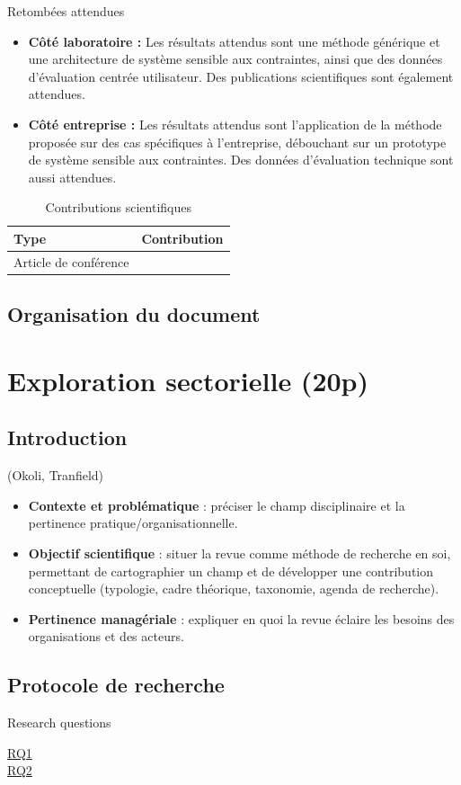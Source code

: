 \documentclass[a4paper,12pt]{article}
\begin{document}
Retombées attendues
\begin{itemize}
\item \textbf{Côté laboratoire :} Les résultats attendus sont une méthode générique et une architecture de système sensible aux contraintes, ainsi que des données d'évaluation centrée utilisateur. Des publications scientifiques sont également attendues.
\item \textbf{Côté entreprise :} Les résultats attendus sont l'application de la méthode proposée sur des cas spécifiques à l'entreprise, débouchant sur un prototype de système sensible aux contraintes. Des données d'évaluation technique sont aussi attendues.
\end{itemize}


\begin{table}[htbp]
\caption{Contributions scientifiques}
\centering
\begin{tabular}{ll}
Type & Contribution\\
\hline
Article de conférence & \\
\end{tabular}
\end{table}
\subsection{Organisation du document}
\label{sec:org5302267}
\clearpage
\section{Exploration sectorielle (20p)}
\label{sec:org3139363}
\subsection{Introduction}
\label{sec:org03f10d4}
(Okoli, Tranfield)
\begin{itemize}
\item \textbf{\textbf{Contexte et problématique}} : préciser le champ disciplinaire et la pertinence pratique/organisationnelle.
\item \textbf{\textbf{Objectif scientifique}} : situer la revue comme méthode de recherche en soi, permettant de cartographier un champ et de développer une contribution conceptuelle (typologie, cadre théorique, taxonomie, agenda de recherche).
\item \textbf{\textbf{Pertinence managériale}} : expliquer en quoi la revue éclaire les besoins des organisations et des acteurs.
\end{itemize}
\subsection{Protocole de recherche}
\label{sec:orgb7f2c40}
Research questions
\begin{description}
\item[{\hyperref[orga6d67e2]{RQ1}}] 

\item[{\hyperref[org6b49f3a]{RQ2}}] 
\end{description}
\end{document}
